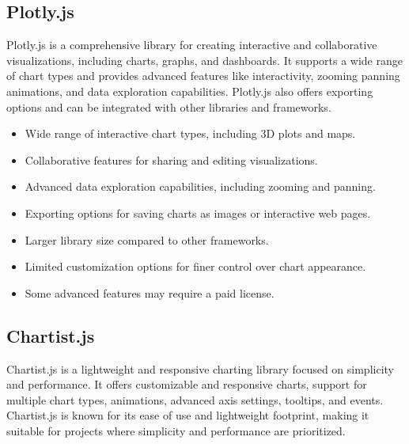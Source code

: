 \documentclass[a4paper, 11pt]{article}
\begin{document}
\subsection{Plotly.js}
Plotly.js is a comprehensive library for creating interactive and collaborative visualizations, including charts, graphs, and dashboards. It supports a wide range of chart types and provides advanced features like interactivity, zooming panning animations, and data exploration capabilities. Plotly.js also offers exporting options and can be integrated with other libraries and frameworks.\par
\medbreak


{\selectfont\large\mdseries\color{MSBlue}{ Main features:}}
\begin{itemize}[noitemsep,nolistsep]
  \item Wide range of interactive chart types, including 3D plots and maps.
  \item Collaborative features for sharing and editing visualizations.
  \item Advanced data exploration capabilities, including zooming and panning.
  \item Exporting options for saving charts as images or interactive web pages.
\end{itemize}\par

\medbreak
{\selectfont\large\mdseries\color{MSBlue}{ Main cons:}}
\begin{itemize}[noitemsep,nolistsep]
  \item Larger library size compared to other frameworks.
  \item Limited customization options for finer control over chart appearance.
  \item Some advanced features may require a paid license.
\end{itemize}

\subsection{Chartist.js}
Chartist.js is a lightweight and responsive charting library focused on simplicity and performance. It offers customizable and responsive charts, support for multiple chart types, animations, advanced axis settings, tooltips, and events. Chartist.js is known for its ease of use and lightweight footprint, making it suitable for projects where simplicity and performance are prioritized.\par
\medbreak
\end{document}
